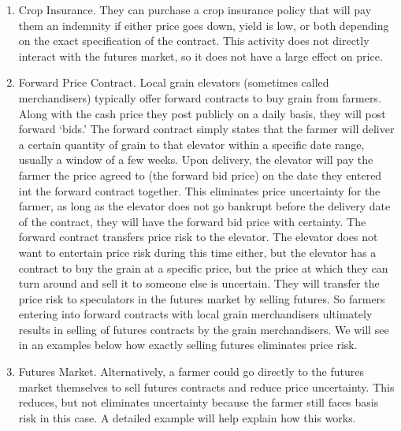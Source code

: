 \documentclass[
]{book}
\begin{document}
\begin{enumerate}
\def\labelenumi{\arabic{enumi}.}
\item
  Crop Insurance. They can purchase a crop insurance policy that will pay them an indemnity if either price goes down, yield is low, or both depending on the exact specification of the contract. This activity does not directly interact with the futures market, so it does not have a large effect on price.
\item
  Forward Price Contract. Local grain elevators (sometimes called merchandisers) typically offer forward contracts to buy grain from farmers. Along with the cash price they post publicly on a daily basis, they will post forward `bids.' The forward contract simply states that the farmer will deliver a certain quantity of grain to that elevator within a specific date range, usually a window of a few weeks. Upon delivery, the elevator will pay the farmer the price agreed to (the forward bid price) on the date they entered int the forward contract together. This eliminates price uncertainty for the farmer, as long as the elevator does not go bankrupt before the delivery date of the contract, they will have the forward bid price with certainty. The forward contract transfers price risk to the elevator. The elevator does not want to entertain price risk during this time either, but the elevator has a contract to buy the grain at a specific price, but the price at which they can turn around and sell it to someone else is uncertain. They will transfer the price risk to speculators in the futures market by selling futures. So farmers entering into forward contracts with local grain merchandisers ultimately results in selling of futures contracts by the grain merchandisers. We will see in an examples below how exactly selling futures eliminates price risk.
\item
  Futures Market. Alternatively, a farmer could go directly to the futures market themselves to sell futures contracts and reduce price uncertainty. This reduces, but not eliminates uncertainty because the farmer still faces basis risk in this case. A detailed example will help explain how this works.
\end{enumerate}
\end{document}
